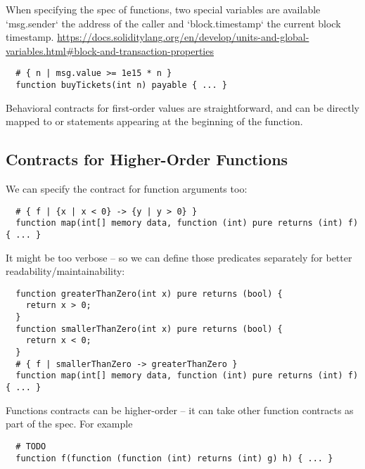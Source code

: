 When specifying the spec of functions, two special variables are available
`msg.sender` the address of the caller and `block.timestamp` the current
block timestamp.
\url{https://docs.soliditylang.org/en/develop/units-and-global-variables.html#block-and-transaction-properties}

\begin{lstlisting}
  # { n | msg.value >= 1e15 * n }
  function buyTickets(int n) payable { ... }
\end{lstlisting}

Behavioral contracts for first-order values are straightforward,
and can be directly mapped to  or  statements
appearing at the beginning of the function.

\subsection{Contracts for Higher-Order Functions}

\iffalse
	\begin{lstlisting}
function map(uint[] memory data, function (uint) pure returns (uint) f)
  internal pure returns (uint[] memory r)
{
  r = new uint[](data.length);
  for (uint i = 0; i < data.length; i++) {
    r[i] = f(data[i]);
  }
}
\end{lstlisting}
\fi

We can specify the contract for function arguments too:
\begin{lstlisting}
  # { f | {x | x < 0} -> {y | y > 0} }
  function map(int[] memory data, function (int) pure returns (int) f) { ... }
\end{lstlisting}
It might be too verbose -- so we can define those predicates separately for better readability/maintainability:
\begin{lstlisting}
  function greaterThanZero(int x) pure returns (bool) {
    return x > 0;
  }
  function smallerThanZero(int x) pure returns (bool) {
    return x < 0;
  }
  # { f | smallerThanZero -> greaterThanZero }
  function map(int[] memory data, function (int) pure returns (int) f) { ... }
\end{lstlisting}

Functions contracts can be higher-order -- it can take other function contracts
as part of the spec. For example
\begin{lstlisting}
  # TODO
  function f(function (function (int) returns (int) g) h) { ... }
\end{lstlisting}

